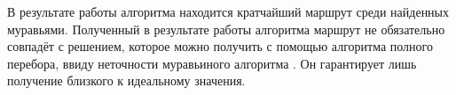 В результате работы алгоритма находится кратчайший маршрут среди найденных муравьями. Полученный в результате работы алгоритма маршрут не обязательно совпадёт с решением, которое можно получить с помощью алгоритма полного перебора, ввиду неточности муравьиного алгоритма \cite{item14}. Он гарантирует лишь получение близкого к идеальному значения.



















\newpage